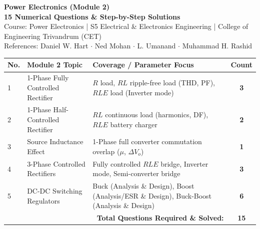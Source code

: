 \documentclass[10pt,a4paper]{article}
\begin{document}
\begin{center}
  {\Huge \bfseries \textcolor{accentcyan}{Power Electronics (Module 2)}}\\[2mm]
  {\Large \bfseries \textcolor{textwhite}{15 Numerical Questions \& Step-by-Step Solutions}}\\[2mm]
  {\small \textcolor{textgray}{Course: Power Electronics | S5 Electrical \& Electronics Engineering | College of Engineering Trivandrum (CET)}}\\[1mm]
  {\footnotesize \textcolor{textgray}{References: Daniel W. Hart $\cdot$ Ned Mohan $\cdot$ L. Umanand $\cdot$ Muhammad H. Rashid}}
\end{center}
\vspace{1mm}

\begin{tcolorbox}[qbox, title={Assignment Topic Distribution (15 Questions Total)}]
\centering
\small
\begin{tabular}{p{0.8cm} p{6.5cm} p{7.5cm} c}
\toprule
\textbf{\textcolor{accentcyan}{No.}} & \textbf{\textcolor{accentcyan}{Module 2 Topic}} & \textbf{\textcolor{accentcyan}{Coverage / Parameter Focus}} & \textbf{\textcolor{accentcyan}{Count}} \\
\midrule
1 & 1-Phase Fully Controlled Rectifier & $R$ load, $RL$ ripple-free load (THD, PF), $RLE$ load (Inverter mode) & \textbf{3} \\
2 & 1-Phase Half-Controlled Rectifier & $RL$ continuous load (harmonics, DF), $RLE$ battery charger & \textbf{2} \\
3 & Source Inductance Effect & 1-Phase full converter commutation overlap ($\mu$, $\Delta V_o$) & \textbf{1} \\
4 & 3-Phase Controlled Rectifiers & Fully controlled $RLE$ bridge, Inverter mode, Semi-converter bridge & \textbf{3} \\
5 & DC-DC Switching Regulators & Buck (Analysis \& Design), Boost (Analysis/ESR \& Design), Buck-Boost (Analysis \& Design) & \textbf{6} \\
\midrule
\multicolumn{3}{r}{\textbf{\textcolor{accentcyan}{Total Questions Required \& Solved:}}} & \textbf{\textcolor{accentamber}{15}} \\
\bottomrule
\end{tabular}
\end{tcolorbox}

\vspace{3mm}

\end{document}
